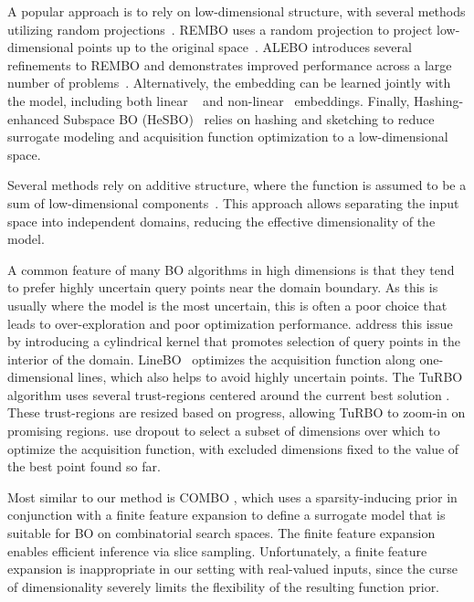 \documentclass[accepted]{uai2021} %
\begin{document}
A popular approach is to rely on low-dimensional structure, with several methods utilizing random projections~\citep{wang2016bayesian,qian2016derivative, binois2020choice,letham2020re}.
REMBO uses a random projection to project low-dimensional points up to the original space~\citep{wang2016bayesian}.
ALEBO introduces several refinements to REMBO and demonstrates improved performance across a large number of problems~\citep{letham2020re}.
Alternatively, the embedding can be learned jointly with the model, including
both linear ~\citep{garnett2013active} and non-linear~\citep{lu2018structured} embeddings.
Finally, Hashing-enhanced Subspace BO (HeSBO)~\citep{nayebi2019framework} relies on hashing and sketching to reduce surrogate modeling and acquisition function optimization to a low-dimensional space.

Several methods rely on additive structure, where the function is assumed to be a sum of low-dimensional components~\citep{kandasamy2015high, gardner2017discovering,mutny2019efficient,wang2018batched}.
This approach allows separating the input space into independent domains, reducing the effective dimensionality of the model.

A common feature of many BO algorithms in high dimensions is that they tend to prefer highly uncertain query points near the domain boundary.
As this is usually where the model is the most uncertain, this is often a poor choice that leads to over-exploration and poor optimization performance.
\citet{oh2018bock} address this issue by introducing a cylindrical kernel that promotes
selection of query points in the interior of the domain.
LineBO~\citep{kirschner2019adaptive} optimizes the acquisition function along one-dimensional lines, which also helps to avoid highly uncertain points.
The TuRBO algorithm uses several trust-regions centered around the current best solution \citep{turbo}.
These trust-regions are resized based on progress, allowing TuRBO to zoom-in on promising regions.
\citet{li2018high} use dropout to select a subset of dimensions over which to optimize the acquisition function, with excluded dimensions fixed to the value of the best point found so far.

Most similar to our method is COMBO \citep{oh2019combinatorial}, which uses a sparsity-inducing prior in conjunction with a finite feature expansion to define a surrogate model that is suitable for BO on combinatorial search spaces. The finite feature expansion enables efficient inference via slice sampling. Unfortunately, a finite feature expansion is inappropriate in our setting with real-valued inputs, since the curse of dimensionality severely limits the flexibility of the resulting function prior.
\end{document}
